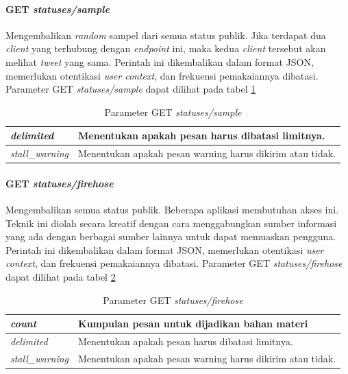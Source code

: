 \paragraph{GET \textit{statuses/sample}}
Mengembalikan \textit{random} sampel dari semua status publik. Jika terdapat dua \textit{client} yang terhubung dengan \textit{endpoint} ini, maka kedua \textit{client} tersebut akan melihat \textit{tweet} yang sama. Perintah ini dikembalikan dalam format JSON, memerlukan otentikasi \textit{user context}, dan frekuensi pemakaiannya dibatasi. Parameter GET \textit{statuses/sample} dapat dilihat pada tabel \ref{table:ParameterGetStatusesSample}

\begin{table}[h]
\caption{Parameter GET \textit{statuses/sample}}
\label{table:ParameterGetStatusesSample}
\begin{tabular}{|l|l|}
\hline
\textit{delimited}          & Menentukan apakah pesan harus dibatasi limitnya. \\ \hline
\textit{stall\_warning}           & Menentukan apakah pesan warning harus dikirim atau tidak.                \\   \hline          
\end{tabular}
\end{table}


\paragraph{GET \textit{statuses/firehose}}
Mengembalikan semua status publik. Beberapa aplikasi membutuhan akses ini. Teknik ini diolah secara kreatif dengan cara menggabungkan sumber informasi yang ada dengan berbagai sumber lainnya untuk dapat memuaskan pengguna. Perintah ini dikembalikan dalam format JSON, memerlukan otentikasi \textit{user context}, dan frekuensi pemakaiannya dibatasi. Parameter GET \textit{statuses/firehose} dapat dilihat pada tabel \ref{table:ParameterGetStatusesFirehose}


\begin{table}[h]
\caption{Parameter GET \textit{statuses/firehose}}
\label{table:ParameterGetStatusesFirehose}
\begin{tabular}{|l|l|}
\hline
\textit{count} & Kumpulan pesan untuk dijadikan bahan materi \\ \hline
\textit{delimited}          & Menentukan apakah pesan harus dibatasi limitnya. \\ \hline
\textit{stall\_warning}           & Menentukan apakah pesan warning harus dikirim atau tidak.                \\     \hline        
\end{tabular}
\end{table}


